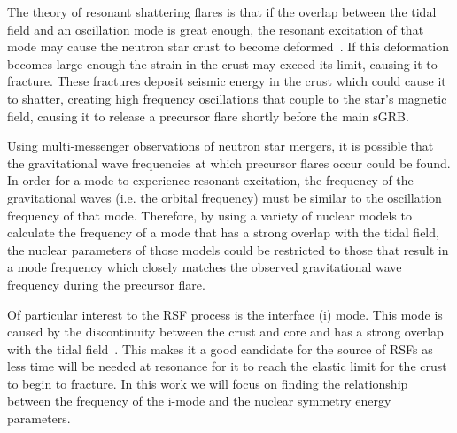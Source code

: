 \documentclass[fleqn,usenatbib]{mnras}
\begin{document}
\hspace{\parindent}The theory of resonant shattering flares is that if the overlap between the tidal field and an oscillation mode is great enough, the resonant excitation of that mode may cause the neutron star crust to become deformed~\cite{troja2010precursors}. If this deformation becomes large enough the strain in the crust may exceed its limit, causing it to fracture. These fractures deposit seismic energy in the crust which could cause it to shatter, creating high frequency oscillations that couple to the star's magnetic field, causing it to release a precursor flare shortly before the main sGRB.%

\hspace{\parindent}Using multi-messenger observations of neutron star mergers, it is possible that the gravitational wave frequencies at which precursor flares occur could be found. In order for a mode to experience resonant excitation, the frequency of the gravitational waves (i.e. the orbital frequency) must be similar to the oscillation frequency of that mode. Therefore, by using a variety of nuclear models to calculate the frequency of a mode that has a strong overlap with the tidal field, the nuclear parameters of those models could be restricted to those that result in a mode frequency which closely matches the observed gravitational wave frequency during the precursor flare. 

\hspace{\parindent}Of particular interest to the RSF process is the interface (i) mode. This mode is caused by the discontinuity between the crust and core and has a strong overlap with the tidal field~\cite{tsang2012resonant}. This makes it a good candidate for the source of RSFs as less time will be needed at resonance for it to reach the elastic limit for the crust to begin to fracture. In this work we will focus on finding the relationship between the frequency of the i-mode and the nuclear symmetry energy parameters.
\end{document}
